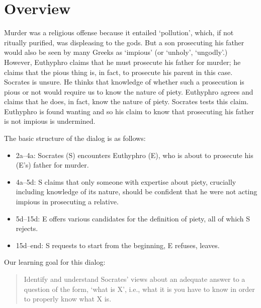 \documentclass[oneside]{article}
\begin{document}
\section*{Overview}

Murder was a religious offense because it entailed `pollution', which, if not ritually purified, was displeasing to the gods. But a son prosecuting his father would also be seen by many Greeks as `impious' (or `unholy', `ungodly'.) However, Euthyphro claims that he must prosecute his father for murder; he claims that the pious thing is, in fact, to prosecute his parent in this case. Socrates is unsure. He thinks that knowledge of whether such a prosecution is pious or not would require us to know the nature of piety. Euthyphro agrees and claims that he does, in fact, know the nature of piety. Socrates tests this claim. Euthyphro  is found wanting and so his claim to know that prosecuting his father is not impious is undermined. 



The basic structure of the dialog is as follows: 
\begin{itemize}\item{2a--4a: Socrates (S) encounters Euthyphro (E), who is about to prosecute his (E's) father for murder.}\item{4a--5d: S claims that only someone with expertise about piety, crucially including knowledge of its nature, should be confident that he were not acting impious in prosecuting a relative.}\item{5d--15d: E offers various candidates for the definition of piety, all of which S rejects.}\item{15d--end: S requests to start from the beginning, E refuses, leaves.}\end{itemize}

Our learning goal for this dialog: 
\begin{quote}
\item  Identify and understand Socrates' views about an adequate answer to  a question of the form, `what is X', i.e., what it is you have to know in order to properly know what X is. 
\end{quote}






\end{document}

